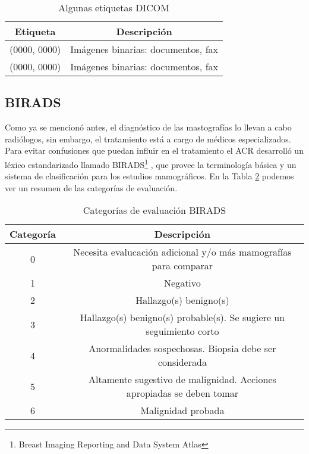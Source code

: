 \begin{table}
  \caption[Etiquetas DICOM]{Algunas etiquetas DICOM} 
  \label{dicom:tags}
\begin{center}
{\small
    \begin{tabular}{c|c}
    \hline
    {\bf Etiqueta} & 
    {\bf Descripción} \\
    \hline
    (0000, 0000) & Imágenes binarias: documentos, fax \\
    (0000, 0000) & Imágenes binarias: documentos, fax \\
    \hline
    \end{tabular}
}
\end{center}
\end{table}

\subsection{BIRADS}

Como ya se mencionó antes, el diagnóstico de las mastografías lo llevan a cabo
radiólogos, sin embargo, el tratamiento está a cargo de médicos especializados.
Para evitar confusiones que puedan influir en el tratamiento el ACR desarrolló
un léxico estandarizado llamado BIRADS\footnote{Breast Imaging Reporting and
Data System Atlas} \cite{reston2003birads}, que provee la terminología básica
y un sistema de clasificación para los estudios mamográficos. En la Tabla
\ref{birads} podemos ver un resumen de las categorías de evaluación.

\begin{table}
  \caption[Categorías de evaluación BIRADS]{Categorías de evaluación BIRADS}
  \label{birads}
\begin{center}
{\small
    \begin{tabular}{c|c}
    \hline
    {\bf Categoría} & 
    {\bf Descripción} \\
    \hline
    0 & Necesita evalucación adicional y/o más mamografías para comparar\\
    1 & Negativo\\
    2 & Hallazgo(s) benigno(s)\\
    3 & Hallazgo(s) benigno(s) probable(s). Se sugiere un seguimiento corto\\
    4 & Anormalidades sospechosas. Biopsia debe ser considerada \\
    5 & Altamente sugestivo de malignidad. Acciones apropiadas se deben tomar\\
    6 & Malignidad probada\\
    \hline
    \end{tabular}
}
\end{center}
\end{table}

